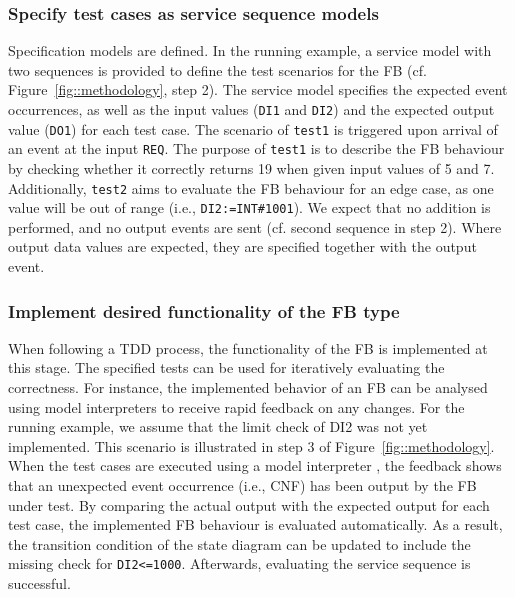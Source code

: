 \subsubsection{Specify test cases as service sequence models} Specification models are defined.
In the running example, a service model with two sequences is provided to define the test scenarios for the FB (cf. Figure~\ref{fig::methodology}, step 2). The service model specifies the expected event occurrences, as well as the input values (\texttt{DI1} and \texttt{DI2}) and the expected output value (\texttt{DO1}) for each test case.  
The scenario of \texttt{test1} is triggered upon arrival of an event at the input \texttt{REQ}. The purpose of \texttt{test1} is to describe the FB behaviour by checking whether it correctly returns 19 when given input values of 5 and 7. 
Additionally, \texttt{test2} aims to evaluate the FB behaviour for an edge case, as one value will be out of range (i.e., \texttt{DI2:=INT\#1001}). We expect that no addition is performed, and no output events are sent (cf. second sequence in step 2). 
Where output data values are expected, they are specified together with the output event. %

    \subsubsection{Implement desired functionality of the FB type}
    When following a TDD process, the functionality of the FB is implemented at this stage. The specified tests can be used for iteratively evaluating the correctness. For instance, the implemented behavior of an FB can be analysed using model interpreters to receive rapid feedback on any changes. 
    For the running example, we assume that the limit check of DI2 was not yet implemented. This scenario is illustrated in step 3 of Figure~\ref{fig::methodology}. When the test cases are executed using a model interpreter \cite{wiesmayr2021}, the feedback shows that an unexpected event occurrence (i.e., CNF) has been output by the FB under test. 
    By comparing the actual output with the expected output for each test case, the implemented FB behaviour is evaluated automatically.
    As a result, the transition condition of the state diagram can be updated to include the missing check for \texttt{DI2<=1000}. Afterwards, evaluating the service sequence is successful.

